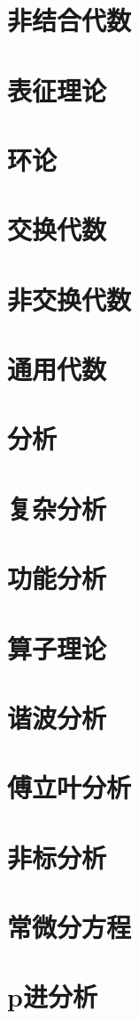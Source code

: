 \documentclass[UTF8]{NatureUniverse}
\begin{document}
\section{非结合代数}
\section{表征理论}
\section{环论}
\section{交换代数}
\section{非交换代数}
\section{通用代数}
\section{分析}
\section{复杂分析}
\section{功能分析}
\section{算子理论}
\section{谐波分析}
\section{傅立叶分析}
\section{非标分析}
\section{常微分方程}
\section{p进分析}
\end{document}
